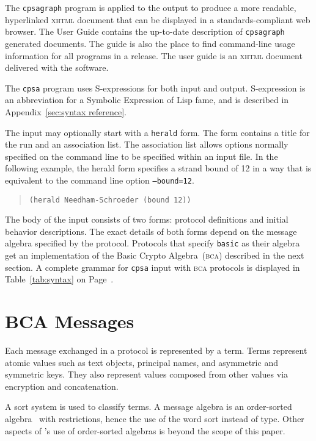 \documentclass[12pt]{article}
\begin{document}
The \texttt{cpsagraph} program is applied to the output to produce a
more readable, hyperlinked \textsc{xhtml} document that can be displayed
in a standards-compliant web browser.  The {\cpsa} User Guide contains
the up-to-date description of \texttt{cpsagraph} generated documents.
The guide is also the place to find command-line usage information for
all programs in a release.  The user guide is an \textsc{xhtml}
document delivered with the software.

The \texttt{cpsa} program uses S-expressions for both input and
output.  S-expression is an abbreviation for a Symbolic Expression of
Lisp fame, and is described in Appendix~\ref{sec:syntax reference}.

The input may optionally start with a \texttt{herald} form.  The form
contains a title for the run and an association list.  The association
list allows options normally specified on the command line to be
specified within an input file.  In the following example, the herald
form specifies a strand bound of 12 in a way that is equivalent to the
command line option \texttt{--bound=12}.

\begin{quote}
\begin{verbatim}
(herald Needham-Schroeder (bound 12))
\end{verbatim}
\end{quote}

The body of the input consists of two forms: protocol definitions and
initial behavior descriptions.  The exact details of both forms depend
on the message algebra specified by the protocol.  Protocols that
specify \texttt{basic} as their algebra get an implementation of the
Basic Crypto Algebra~(\textsc{bca}) described in the next section.  A
complete grammar for \texttt{cpsa} input with \textsc{bca} protocols
is displayed in Table~\ref{tab:syntax} on Page~\pageref{tab:syntax}.

\section{BCA Messages}

Each message exchanged in a protocol is represented by a term.  Terms
represent atomic values such as text objects, principal names, and
asymmetric and symmetric keys.  They also represent values composed
from other values via encryption and concatenation.

A sort system is used to classify terms. A {\cpsa} message algebra is
an order-sorted algebra~\cite{GoguenMeseguer92} with restrictions,
hence the use of the word sort instead of type.  Other aspects of
{\cpsa}'s use of order-sorted algebras is beyond the scope of this
paper.
\end{document}
